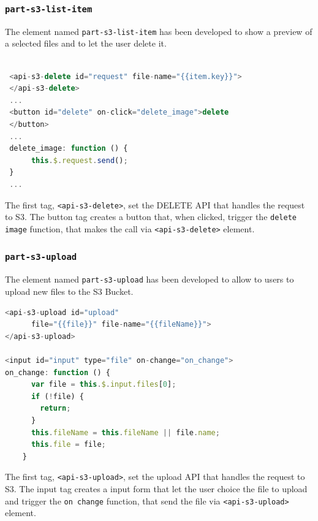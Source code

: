 \subsubsection{\texttt{part-s3-list-item}}
\label{part-s3-list-item}
The element named \texttt{part-s3-list-item} has been developed to show a preview of a selected files and to let the user delete it.
\begin{lstlisting}[language=javascript]

 <api-s3-delete id="request" file-name="{{item.key}}">
 </api-s3-delete>
 ...
 <button id="delete" on-click="delete_image">delete
 </button>
 ...
 delete_image: function () {
      this.$.request.send();
 }
 ...
\end{lstlisting}

The first tag, \texttt{<api-s3-delete>}, set the DELETE API that handles the request to S3.
The button tag creates a button that, when clicked, trigger the \texttt{delete image} function, that makes the call via \texttt{<api-s3-delete>} element.


\subsubsection{\texttt{part-s3-upload}}
\label{part-s3-upload}
The element named \texttt{part-s3-upload} has been developed to allow to users to upload new files to the S3 Bucket.

\begin{lstlisting}[language=javascript]
<api-s3-upload id="upload"
      file="{{file}}" file-name="{{fileName}}">
</api-s3-upload>

<input id="input" type="file" on-change="on_change">
on_change: function () {
      var file = this.$.input.files[0];
      if (!file) {
        return;
      }
      this.fileName = this.fileName || file.name;
      this.file = file;
    }

\end{lstlisting}

The first tag, \texttt{<api-s3-upload>}, set the upload API that handles the request to S3.
The input tag creates a input form that let the user choice the file to upload and trigger the \texttt{on change} function, that send the file via \texttt{<api-s3-upload>} element.
